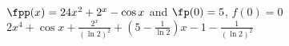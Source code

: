 {$\fpp(x) = 24x^2+2^x-\cos x$ and $\fp(0)= 5$, $f(0) = 0$
}
{%
$2x^4+\cos x+\frac{2^x}{(\ln 2)^2}+(5-\frac1{\ln 2})x -1 - \frac{1}{(\ln 2)^2}$
}

